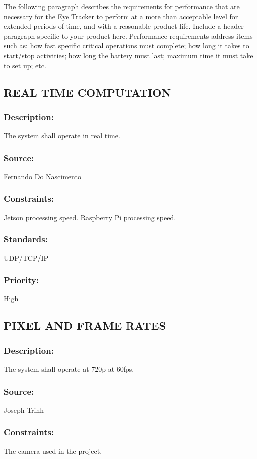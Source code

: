 The following paragraph describes the requirements for performance that are necessary for the Eye Tracker to perform at a more than acceptable level for extended periods of time, and with a reasonable product life.
Include a header paragraph specific to your product here. Performance requirements address items such as: how fast specific critical operations must complete; how long it takes to start/stop activities; how long the battery must last; maximum time it must take to set up; etc.

\subsection{\text REAL TIME COMPUTATION}
\subsubsection{Description:} 
	{The system shall operate in real time.}
\subsubsection{Source:} 
	{Fernando Do Nascimento}
\subsubsection{Constraints:} 
	{Jetson processing speed. Raspberry Pi processing speed.}
\subsubsection{Standards:} 
	{UDP/TCP/IP}
\subsubsection{Priority:} 
	{High}
\newline
	
\subsection{\text PIXEL AND FRAME RATES}
\subsubsection{Description:} 
	{The system shall operate at 720p at 60fps.}
\subsubsection{Source:} 
	{Joseph Trinh}
\subsubsection{Constraints:} 
	{The camera used in the project.}
